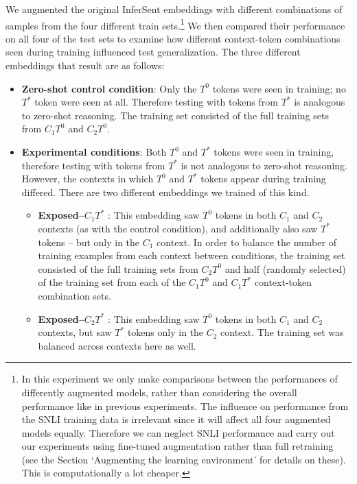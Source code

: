 We augmented the original InferSent embeddings with different combinations of samples from the four different train sets.\footnote{In this experiment we only make comparisons between the performances of differently augmented models, rather than considering the overall performance like in previous experiments. The influence on performance from the SNLI training data is irrelevant since it will affect all four augmented models equally. Therefore we can neglect SNLI performance and carry out our experiments using fine-tuned augmentation rather than full retraining (see the Section `Augmenting the learning environment' for details on these). This is computationally a lot cheaper.} We then compared their performance on all four of the test sets to examine how different context-token combinations seen during training influenced test generalization. The three different embeddings that result are as follows:
\vspace{-2mm}
\begin{itemize}
\itemsep0em
    \item \textbf{Zero-shot control condition}: Only the $T^{0}$ tokens were seen in training; no $T^{*}$ token were seen at all. Therefore testing with tokens from $T^{*}$ is analogous to zero-shot reasoning. The training set consisted of the full training sets from $C_{1}T^{0}$ and $C_{2}T^{0}$.
    \item \textbf{Experimental conditions}: Both $T^{0}$ and $T^{*}$ tokens were seen in training, therefore testing with tokens from $T^{*}$ is not analogous to zero-shot reasoning. However, the contexts in which $T^{0}$ and $T^{*}$ tokens appear during training differed. There are two different embeddings we trained of this kind.
    \begin{itemize}
        \item \textbf{Exposed--$C_{1}T^{*}$ }: This embedding saw $T^{0}$ tokens in both $C_{1}$ and $C_{2}$ contexts (as with the control condition), and additionally also saw $T^{*}$ tokens -- but only in the $C_{1}$ context.
        In order to balance the number of training examples from each context between conditions, the training set consisted of the full training sets from $C_{2}T^{0}$ and half (randomly selected) of the training set from each of the $C_{1}T^{0}$ and $C_{1}T^{*}$ context-token combination sets.
        \item \textbf{Exposed--$C_{2}T^{*}$ }: This embedding saw $T^{0}$ tokens in both $C_{1}$ and $C_{2}$ contexts, but saw $T^{*}$ tokens only in the $C_{2}$ context. The training set was balanced across contexts here as well.
    \end{itemize}
\end{itemize}


